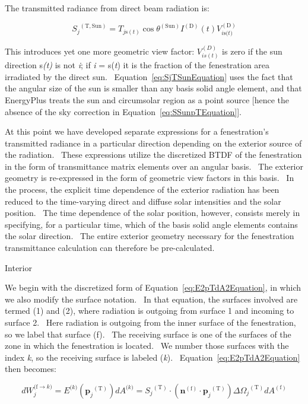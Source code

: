The transmitted radiance from direct beam radiation is:

\begin{equation}
{S_j}^{{\mathrm{(T, Sun)}}} = {T_{j{\mathrm{ s}}(t)}}\cos {\theta ^{{\mathrm{(Sun)}}}}{I^{{\mathrm{(D)}}}}(t)V_{i{\mathrm{ s(}}t{\mathrm{)}}}^{{\mathrm{(D)}}}
\label{eq:SjTSunEquation}
\end{equation}

This introduces yet one more geometric view factor: $V_{i s(t)}^{(D)}$ is zero if the sun direction s\emph{(t)} is not \emph{i}; if \emph{i} = s(\emph{t}) it is the fraction of the fenestration area irradiated by the direct sun.~ Equation~\ref{eq:SjTSunEquation} uses the fact that the angular size of the sun is smaller than any basis solid angle element, and that EnergyPlus treats the sun and circumsolar region as a point source {[}hence the absence of the sky correction in Equation~\ref{eq:SSunpTEquation}{]}.

At this point we have developed separate expressions for a fenestration's~ transmitted radiance in a particular direction depending on the exterior source of the radiation.~ These expressions utilize the discretized BTDF of the fenestration in the form of transmittance matrix elements over an angular basis.~ The exterior geometry is re-expressed in the form of geometric view factors in this basis.~ In the process, the explicit time dependence of the exterior radiation has been reduced to the time-varying direct and diffuse solar intensities and the solar position.~ The time dependence of the solar position, however, consists merely in specifying, for a particular time, which of the basis solid angle elements contains the solar direction.~ The entire exterior geometry necessary for the fenestration transmittance calculation can therefore be pre-calculated.

Interior

We begin with the discretized form of Equation~\ref{eq:E2pTdA2Equation}, in which we also modify the surface notation.~ In that equation, the surfaces involved are termed (1) and (2), where radiation is outgoing from surface 1 and incoming to surface 2.~ Here radiation is outgoing from the inner surface of the fenestration, so we label that surface (f).~ The receiving surface is one of the surfaces of the zone in which the fenestration is located.~ We number those surfaces with the index \emph{k}, so the receiving surface is labeled (\emph{k}).~ Equation~\ref{eq:E2pTdA2Equation} then becomes:

\begin{equation}
dW_j^{{\mathrm{(f}} \to k{\mathrm{)}}} = {E^{{\mathrm{(}}k{\mathrm{)}}}}({{\mathbf{p}}_j}^{{\mathrm{(T)}}})d{A^{{\mathrm{(}}k{\mathrm{)}}}} = {S_j}^{{\mathrm{(T)}}} \cdot \left( {{{\mathbf{n}}^{{\mathrm{(f)}}}} \cdot {{\mathbf{p}}_j}^{{\mathrm{(T)}}}} \right)\Delta {\Omega_j}^{{\mathrm{(T)}}}d{A^{{\mathrm{(f)}}}}
\end{equation}


